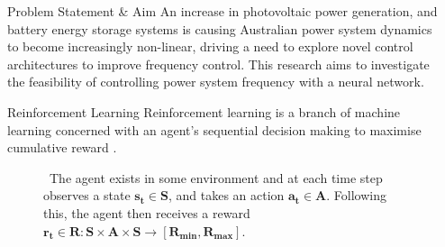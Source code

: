 \documentclass[final]{beamer}
\newlength{\sepwid}
\newlength{\onecolwid}
\begin{document}
\begin{frame}[t] %

\begin{columns}[t] %

\begin{column}{\sepwid}\end{column} %

\begin{column}{\onecolwid} %

\vspace{-1.5cm}
\begin{block}{Problem Statement \& Aim}
An increase in photovoltaic power generation, and battery energy storage systems is causing Australian power system dynamics to become increasingly non-linear, driving a need to explore novel control architectures to improve frequency control. This research aims to investigate the feasibility of controlling power system frequency with a neural network.
\end{block}


\vspace{-0.75cm}
\begin{block}{Reinforcement Learning}
Reinforcement learning is a branch of machine learning concerned with an agent's sequential decision making to maximise cumulative reward \cite{Sutton2018}.
\vspace{0.52cm}
	\begin{figure}
		
		\caption{ \ The agent exists in some environment and at each time step observes a state $\boldsymbol{s_t \in S}$, and takes an action $\boldsymbol{a_t \in A}$. Following this, the agent then receives a reward $\boldsymbol{r_t \in R: S \times A \times S \to [R_{min}, R_{max}]}$.}
	\end{figure}
\end{block}

\vspace{-0.9cm}


\end{column}
\end{columns}
\end{frame}
\end{document}
